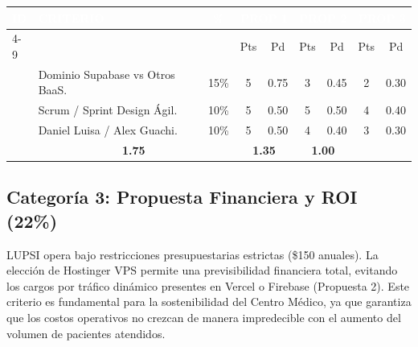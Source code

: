 \documentclass[a4paper,12pt]{article}
\renewcommand{\arraystretch}{1.1}
\begin{document}
\begin{table}[H]
\centering
\small
\renewcommand{\arraystretch}{1.5}
\begin{tabularx}{\linewidth}{|p{1.5cm}|X|c|c|c|c|c|c|c|}
\hline
\rowcolor{SKTPrimary} \textcolor{white}{\textbf{ID}} & \textcolor{white}{\textbf{CRITERIO}} & \textcolor{white}{\textbf{\%}} & \multicolumn{2}{c|}{\textcolor{white}{\textbf{PROP 1}}} & \multicolumn{2}{c|}{\textcolor{white}{\textbf{PROP 2}}} & \multicolumn{2}{c|}{\textcolor{white}{\textbf{PROP 3}}} \\ \cline{4-9}
& & & Pts & Pd & Pts & Pd & Pts & Pd \\ \hline
[TECH] & Dominio Supabase vs Otros BaaS. & 15\% & 5 & 0.75 & 3 & 0.45 & 2 & 0.30 \\ \hline
[METH] & Scrum / Sprint Design Ágil. & 10\% & 5 & 0.50 & 5 & 0.50 & 4 & 0.40 \\ \hline
[TEAM] & Daniel Luisa / Alex Guachi. & 10\% & 5 & 0.50 & 4 & 0.40 & 3 & 0.30 \\ \hline
\rowcolor{catTech} \multicolumn{3}{|c|}{\textbf{SUBTOTAL CATEGORÍA}} & \multicolumn{2}{c|}{\textbf{1.75}} & \multicolumn{2}{c|}{\textbf{1.35}} & \multicolumn{2}{c|}{\textbf{1.00}} \\ \hline
\end{tabularx}
\end{table}

\subsection{Categoría 3: Propuesta Financiera y ROI (22\%)}
LUPSI opera bajo restricciones presupuestarias estrictas (\$150 anuales). La elección de Hostinger VPS permite una previsibilidad financiera total, evitando los cargos por tráfico dinámico presentes en Vercel o Firebase (Propuesta 2). Este criterio es fundamental para la sostenibilidad del Centro Médico, ya que garantiza que los costos operativos no crezcan de manera impredecible con el aumento del volumen de pacientes atendidos.
\end{document}
